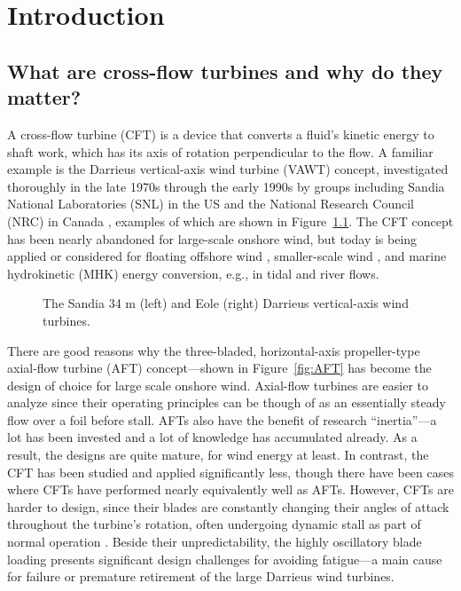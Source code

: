 \chapter{Introduction}


\section{What are cross-flow turbines and why do they matter?}

A cross-flow turbine (CFT) is a device that converts a fluid's kinetic energy to
shaft work, which has its axis of rotation perpendicular to the flow. A familiar
example is the Darrieus vertical-axis wind turbine (VAWT) concept, investigated
thoroughly in the late 1970s through the early 1990s by groups including Sandia
National Laboratories (SNL) in the US and the National Research Council (NRC) in
Canada \cite{Para2002}, examples of which are shown in
Figure~\ref{fig:Darrieus}. The CFT concept has been nearly abandoned for
large-scale onshore wind, but today is being applied or considered for floating
offshore wind \cite{Sandia2012, Paulsen2011}, smaller-scale wind
\cite{Giges2012}, and marine hydrokinetic (MHK) energy conversion, e.g., in
tidal and river flows.

\begin{figure}[ht]
\caption{The Sandia 34 m (left) and Eole (right) Darrieus vertical-axis wind
turbines.}
\label{fig:Darrieus}
\end{figure}

There are good reasons why the three-bladed, horizontal-axis propeller-type
axial-flow turbine (AFT) concept---shown in Figure~\ref{fig:AFT} has become the
design of choice for large scale onshore wind. Axial-flow turbines are easier to
analyze since their operating principles can be though of as an essentially
steady flow over a foil before stall. AFTs also have the benefit of research
``inertia''---a lot has been invested and a lot of knowledge has accumulated
already. As a result, the designs are quite mature, for wind energy at least. In
contrast, the CFT has been studied and applied significantly less, though there
have been cases where CFTs have performed nearly equivalently well as AFTs.
However, CFTs are harder to design, since their blades are constantly changing
their angles of attack throughout the turbine's rotation, often undergoing
dynamic stall as part of normal operation \cite{Para2002}. Beside their
unpredictability, the highly oscillatory blade loading presents significant
design challenges for avoiding fatigue---a main cause for failure or premature
retirement of the large Darrieus wind turbines.

